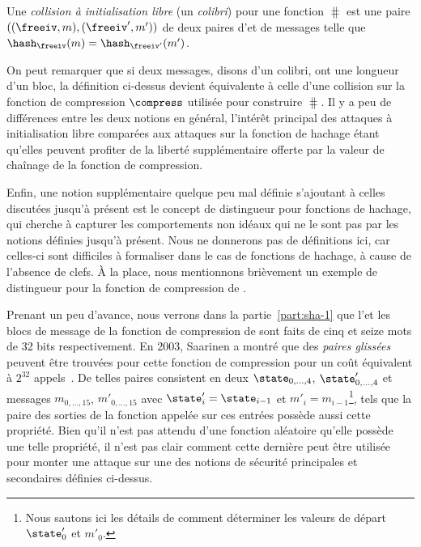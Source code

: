 \begin{fdefi}
Une \emph{collision à initialisation libre} (un \emph{colibri})
pour une fonction \merkdam 
$\hash$ est une paire $((\freeiv,m), (\freeiv',m'))$
de deux paires d'\iv et de messages telle que $\hash_\freeiv(m) = \hash_{\freeiv'}(m')$.
\end{fdefi}

On peut remarquer que si deux messages, disons d'un colibri, ont une longueur d'un bloc, la définition ci-dessus devient équivalente à celle
d'une collision sur la fonction de compression
$\compress$ utilisée pour construire $\hash$.
Il y a peu de différences entre les deux notions en général, l'intérêt principal des
attaques à initialisation libre comparées aux attaques sur la fonction de hachage étant qu'elles
peuvent profiter de la liberté supplémentaire offerte par la valeur de chaînage de la fonction de compression.

\bigskip

Enfin, une notion supplémentaire quelque peu mal définie s'ajoutant à celles discutées jusqu'à présent est le concept de distingueur pour fonctions de hachage,
qui cherche à capturer les comportements non idéaux qui ne le sont pas par les notions définies jusqu'à présent. Nous ne donnerons pas de définitions ici,
car celles-ci sont difficiles à formaliser dans le cas de fonctions de hachage, à cause de l'absence de clefs. À la place, nous mentionnons brièvement
un exemple de distingueur pour la fonction de compression de \shaone. 

Prenant un peu d'avance, nous verrons dans la partie~\ref{part:sha-1} que l'\iv et les blocs de message  de la fonction
de compression de \shaone sont faits de cinq et seize mots de 32 bits respectivement.
En 2003, Saarinen a montré que des \emph{paires glissées} peuvent être trouvées pour cette fonction de compression pour un coût
équivalent à $2^{32}$ appels~\cite{DBLP:conf/fse/Saarinen03}.
De telles paires consistent en deux
\ivs $\state_{0,\ldots,4}$, $\state'_{0,\ldots,4}$ et messages $m_{0,\ldots,15}$,
$m'_{0,\ldots,15}$ avec $\state'_i = \state_{i-1}$ et $m'_i = m_{i-1}$\footnote{Nous sautons ici les détails de comment déterminer les valeurs de départ
$\state'_0$ et $m'_0$.}, tels que la paire des sorties de la fonction appelée sur ces entrées possède aussi cette propriété.
Bien qu'il n'est pas attendu d'une fonction aléatoire qu'elle possède une telle propriété, il n'est pas clair comment cette dernière peut être utilisée pour monter
une attaque sur une des notions de sécurité principales et secondaires définies ci-dessus.


